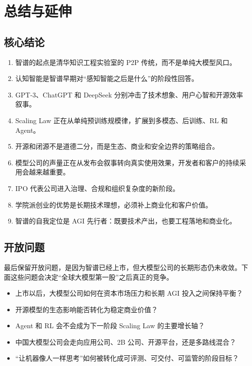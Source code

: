 \section{总结与延伸}

\subsection{核心结论}

\begin{enumerate}
\item 智谱的起点是清华知识工程实验室的 P2P 传统，而不是单纯大模型风口。
\item 认知智能是智谱早期对“感知智能之后是什么”的阶段性回答。
\item GPT-3、ChatGPT 和 DeepSeek 分别冲击了技术想象、用户心智和开源效率叙事。
\item Scaling Law 正在从单纯预训练规模律，扩展到多模态、后训练、RL 和 Agent。
\item 开源和闭源不是道德二分，而是生态、商业和安全边界的策略组合。
\item 模型公司的声量正在从发布会叙事转向真实使用效果，开发者和客户的持续采用会越来越重要。
\item IPO 代表公司进入治理、合规和组织复杂度的新阶段。
\item 学院派创业的优势是长期技术理想，必须补上商业化和客户价值。
\item 智谱的自我定位是 AGI 先行者：既要技术产出，也要工程落地和商业化。
\end{enumerate}

\subsection{开放问题}

最后保留开放问题，是因为智谱已经上市，但大模型公司的长期形态仍未收敛。下面这些问题会决定“全球大模型第一股”之后真正的竞争。

\begin{itemize}
\item 上市以后，大模型公司如何在资本市场压力和长期 AGI 投入之间保持平衡？
\item 开源模型的生态影响能否转化为稳定商业价值？
\item Agent 和 RL 会不会成为下一阶段 Scaling Law 的主要增长轴？
\item 中国大模型公司会走向应用公司、2B 公司、开源平台，还是多路线混合？
\item “让机器像人一样思考”如何被转化成可评测、可交付、可监管的阶段目标？
\end{itemize}

